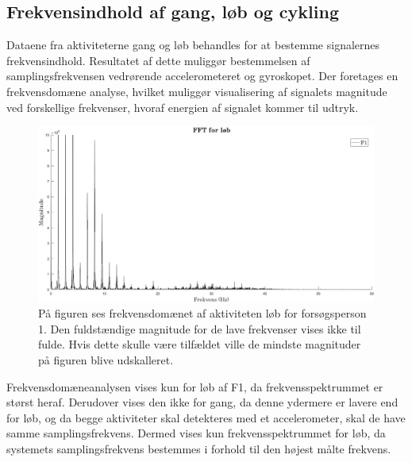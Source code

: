 \subsection{Frekvensindhold af gang, løb og cykling}
Dataene fra aktiviteterne gang og løb behandles for at bestemme signalernes frekvensindhold. Resultatet af dette muliggør bestemmelsen af samplingsfrekvensen vedrørende accelerometeret og gyroskopet. Der foretages en frekvensdomæne analyse, hvilket muliggør visualisering af signalets magnitude ved forskellige frekvenser, hvoraf energien af signalet kommer til udtryk.
\begin{figure}[H]
	\centering
	\includegraphics[scale=0.40]{figures/qBilag/fft_f1_loeb}
	\caption{På figuren ses frekvensdomænet af aktiviteten løb for forsøgsperson 1. Den fuldstændige magnitude for de lave frekvenser vises ikke til fulde. Hvis dette skulle være tilfældet ville de mindste magnituder på figuren blive udskalleret.}
	\label{fig:Ap_FFt}
\end{figure}\vspace{-.25cm}
Frekvensdomæneanalysen vises kun for løb af F1, da frekvensspektrummet er størst heraf. Derudover vises den ikke for gang, da denne ydermere er lavere end for løb, og da begge aktiviteter skal detekteres med et accelerometer, skal de have samme samplingsfrekvens. Dermed vises kun frekvensspektrummet for løb, da systemets samplingsfrekvens bestemmes i forhold til den højest målte frekvens.

